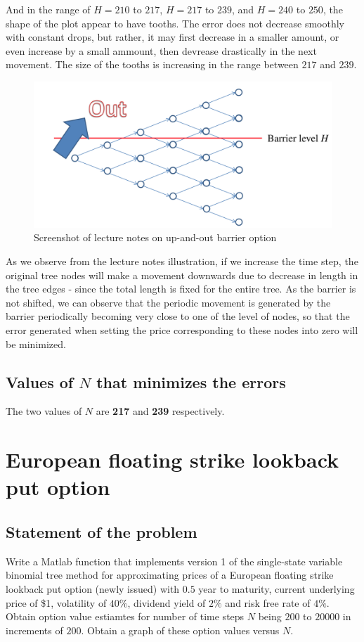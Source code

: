 And in the range of $H = 210$ to $217$, $H = 217$ to $239$, and $H = 240$ to $250$, the shape of the plot appear to have tooths. The error does not decrease smoothly with constant drops, but rather, it may first decrease in a smaller amount, or even increase by a small ammount, then devrease drastically in the next movement. The size of the tooths is increasing in the range between $217$ and $239$.

\begin{figure}[htbp!]
	\centering
	\includegraphics[scale=0.4]{Lattice_lecturenotes.PNG}
	\caption{Screenshot of lecture notes on up-and-out barrier option}
\end{figure}

As we observe from the lecture notes illustration, if we increase the time step, the original tree nodes will make a movement downwards due to decrease in length in the tree edges - since the total length is fixed for the entire tree. As the barrier is not shifted, we can observe that the periodic movement is generated by the barrier periodically becoming very close to one of the level of nodes, so that the error generated when setting the price corresponding to these nodes into zero will be minimized.

\subsection{Values of $N$ that minimizes the errors}
The two values of $N$ are \textbf{217} and \textbf{239} respectively.

\newpage

\section{European floating strike lookback put option}
\subsection*{Statement of the problem}
Write a Matlab function that implements version 1 of the single-state variable binomial tree method for approximating prices of a European floating strike lookback put option (newly issued) with $0.5$ year to maturity, current underlying price of \$1, volatility of $40\%$, dividend yield of $2\%$ and risk free rate of $4\%$. Obtain option value estiamtes for number of time steps $N$ being $200$ to $20000$ in increments of $200$. Obtain a graph of these option values versus $N$.


